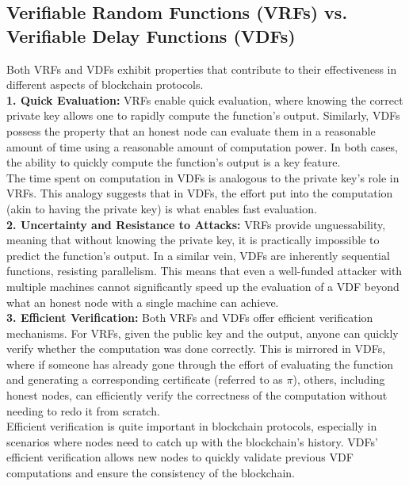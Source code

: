 \subsection{Verifiable Random Functions (VRFs) vs. Verifiable Delay Functions (VDFs)}
Both VRFs and VDFs exhibit properties that contribute to their effectiveness in different aspects of blockchain protocols.\\

\noindent
\textbf{1. Quick Evaluation:}
VRFs enable quick evaluation, where knowing the correct private key allows one to rapidly compute the function's output. Similarly, VDFs possess the property that an honest node can evaluate them in a reasonable amount of time using a reasonable amount of computation power. In both cases, the ability to quickly compute the function's output is a key feature.\\
The time spent on computation in VDFs is analogous to the private key's role in VRFs. This analogy suggests that in VDFs, the effort put into the computation (akin to having the private key) is what enables fast evaluation.\\

\noindent
\textbf{2. Uncertainty and Resistance to Attacks:}
VRFs provide unguessability, meaning that without knowing the private key, it is practically impossible to predict the function's output. In a similar vein, VDFs are inherently sequential functions, resisting parallelism. This means that even a well-funded attacker with multiple machines cannot significantly speed up the evaluation of a VDF beyond what an honest node with a single machine can achieve.\\

\noindent
\textbf{3. Efficient Verification:}
Both VRFs and VDFs offer efficient verification mechanisms. For VRFs, given the public key and the output, anyone can quickly verify whether the computation was done correctly. This is mirrored in VDFs, where if someone has already gone through the effort of evaluating the function and generating a corresponding certificate (referred to as $\pi$), others, including honest nodes, can efficiently verify the correctness of the computation without needing to redo it from scratch.\\
Efficient verification is quite important in blockchain protocols, especially in scenarios where nodes need to catch up with the blockchain's history. VDFs' efficient verification allows new nodes to quickly validate previous VDF computations and ensure the consistency of the blockchain.

